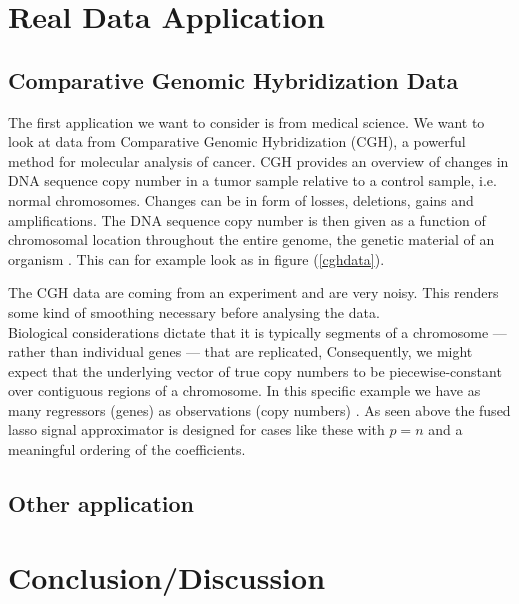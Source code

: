 \documentclass{article}
\theoremstyle{definition}
\begin{document}
\section{Real Data Application}

\subsection{Comparative Genomic Hybridization Data}
The first application we want to consider is from medical science. We want to look at data from Comparative Genomic Hybridization (CGH), a powerful method for molecular analysis of cancer.    
CGH provides an overview of changes in DNA sequence copy number in a tumor sample 
relative to a control sample, i.e. normal chromosomes. Changes can be in form of losses, deletions, gains and amplifications\citep{cghmain}. The DNA  sequence copy number is then given as a function of chromosomal location throughout the entire genome, the genetic material of an organism \citep{cghsecond}. This can for example look as in figure (\ref{cghdata}).

The CGH data are coming from an experiment and are very noisy. This renders some kind of smoothing necessary before analysing the data. \\
Biological considerations dictate that it is typically segments of a chromosome — rather than individual genes — that are replicated, Consequently, we might expect that the underlying vector of true copy numbers to be piecewise-constant over contiguous regions of a chromosome.
In this specific example we have as many regressors (genes) as observations (copy numbers) \citep{sparsity}.
As seen above the fused lasso signal approximator is designed for cases like these with $ p = n$ and a meaningful ordering of the coefficients.

\subsection{Other application}

\section{Conclusion/Discussion}
\end{document}
